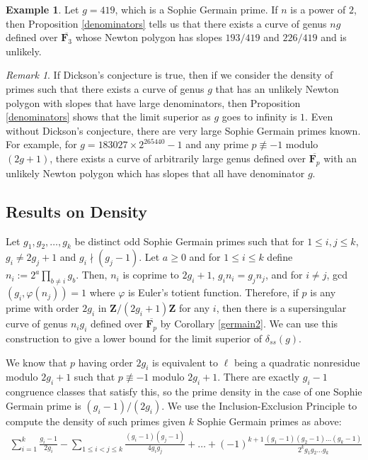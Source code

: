 \documentclass{article}
\theoremstyle{remark}
\newtheorem{remark}[theorem]{Remark}
\theoremstyle{definition}
\newtheorem{example}[theorem]{Example}
\begin{document}
\begin{example}
    Let $g = 419$, which is a Sophie Germain prime. If $n$ is a power of $2$, then Proposition \ref{denominators} tells us that there exists a curve of genus $ng$ defined over $\overline{\mathbf{F}_3}$ whose Newton polygon has slopes $193/419$ and $226/419$ and is unlikely.
\end{example}

\begin{remark}
If Dickson's conjecture is true, then if we consider the density of primes such that there exists a curve of genus $g$ that has an unlikely Newton polygon with slopes that have large denominators, then Proposition \ref{denominators} shows that the limit superior as $g$ goes to infinity is $1$. Even without Dickson's conjecture, there are very large Sophie Germain primes known. For example, for $g = 183027 \times 2^{265440} - 1$ and any prime $p \not \equiv -1$ modulo $(2g+1)$, there exists a curve of arbitrarily large genus defined over $\overline{\mathbf{F}_p}$ with an unlikely Newton polygon which has slopes that all have denominator $g$.
\end{remark}

\subsection{Results on Density}
\par \hspace{\parindent} Let $g_1, g_2, \ldots, g_k$ be distinct odd Sophie Germain primes such that for $1 \leq i,j \leq k$, $g_i \neq 2g_j+1$ and $g_i \nmid (g_j-1)$. Let $a \geq 0$ and for $1 \leq i \leq k$ define $n_i := 2^a \prod_{b \neq i} g_b$. Then, $n_i$ is coprime to $2g_i+1$, $g_in_i = g_jn_j$, and for $i \neq j$, gcd$(g_i, \varphi(n_j)) = 1$ where $\varphi$ is Euler's totient function. Therefore, if $p$ is any prime with order $2g_i$ in $\mathbf{Z}/(2g_i+1)\mathbf{Z}$ for any $i$, then there is a supersingular curve of genus $n_ig_i$ defined over $\overline{\mathbf{F}_p}$ by Corollary \ref{germain2}. We can use this construction to give a lower bound for the limit superior of $\delta_{ss}(g)$.
\par We know that $p$ having order $2g_i$ is equivalent to $\ell$ being a quadratic nonresidue modulo $2g_i+1$ such that $p \not \equiv -1$ modulo $2g_i+1$. There are exactly $g_i -1$ congruence classes that satisfy this, so the prime density in the case of one Sophie Germain prime is $(g_i-1)/(2g_i)$. We use the Inclusion-Exclusion Principle to compute the density of such primes given $k$ Sophie Germain primes as above:
\begin{align}\sum_{i=1}^k \frac{g_i-1}{2g_i} - \sum_{1 \leq i < j \leq k}\frac{(g_i-1)(g_j-1)}{4g_ig_j} + \ldots + (-1)^{k+1} \frac{(g_1-1)(g_2-1)\ldots(g_k-1)}{2^kg_1g_2\ldots g_k} \label{ie} \end{align}
\end{document}
